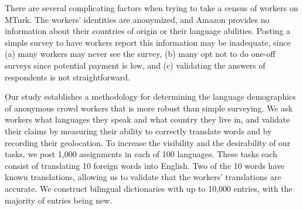 \documentclass[11pt]{article}
\begin{document}
There are several complicating factors when trying to take a census of workers on MTurk.  The workers' identities are anonymized, and Amazon provides no information about their countries of origin or their language abilities.  Posting a simple survey to have workers report this information may be inadequate, since (a) many workers may never see the survey, (b) many opt not to do one-off surveys since potential payment is low, and (c) validating the answers of respondents is not straightforward. 

Our study establishes a methodology for determining the language demographics of anonymous crowd workers that is more robust than simple surveying. We ask workers what languages they speak and what country they live in, and validate their claims by measuring their ability to correctly translate words and by recording their geolocation.  To increase the visibility and the desirability of our tasks, we post 1,000 assignments in each of 100 languages.  These tasks each consist of translating 10 foreign words into English.  Two of the 10 words have known translations, allowing us to validate that the workers' translations are accurate.  We construct bilingual dictionaries with up to 10,000 entries, with the majority of entries being new. 
\end{document}
